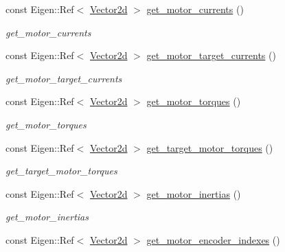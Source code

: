 \begin{DoxyCompactItemize}
const Eigen\+::\+Ref$<$ \hyperlink{common__header_8hpp_acb6916bc8c9fe9d98c484fd4cc201447}{Vector2d} $>$ \hyperlink{classblmc__robots_1_1Stuggihop_a6da6fdecb11573e52a0c059d84e7f4c5}{get\+\_\+motor\+\_\+currents} ()
\begin{DoxyCompactList}\small\item\em get\+\_\+motor\+\_\+currents \end{DoxyCompactList}\item 
const Eigen\+::\+Ref$<$ \hyperlink{common__header_8hpp_acb6916bc8c9fe9d98c484fd4cc201447}{Vector2d} $>$ \hyperlink{classblmc__robots_1_1Stuggihop_a8caaf3092fab4df7cb4a21c785a92caa}{get\+\_\+motor\+\_\+target\+\_\+currents} ()
\begin{DoxyCompactList}\small\item\em get\+\_\+motor\+\_\+target\+\_\+currents \end{DoxyCompactList}\item 
const Eigen\+::\+Ref$<$ \hyperlink{common__header_8hpp_acb6916bc8c9fe9d98c484fd4cc201447}{Vector2d} $>$ \hyperlink{classblmc__robots_1_1Stuggihop_aa3c24185a4ce67f235c535e4913832d2}{get\+\_\+motor\+\_\+torques} ()
\begin{DoxyCompactList}\small\item\em get\+\_\+motor\+\_\+torques \end{DoxyCompactList}\item 
const Eigen\+::\+Ref$<$ \hyperlink{common__header_8hpp_acb6916bc8c9fe9d98c484fd4cc201447}{Vector2d} $>$ \hyperlink{classblmc__robots_1_1Stuggihop_aa37d49ec5e4fb52bac480aa552fc4546}{get\+\_\+target\+\_\+motor\+\_\+torques} ()
\begin{DoxyCompactList}\small\item\em get\+\_\+target\+\_\+motor\+\_\+torques \end{DoxyCompactList}\item 
const Eigen\+::\+Ref$<$ \hyperlink{common__header_8hpp_acb6916bc8c9fe9d98c484fd4cc201447}{Vector2d} $>$ \hyperlink{classblmc__robots_1_1Stuggihop_acffc9bf97d4b58ad49703855a70b95cf}{get\+\_\+motor\+\_\+inertias} ()
\begin{DoxyCompactList}\small\item\em get\+\_\+motor\+\_\+inertias \end{DoxyCompactList}\item 
const Eigen\+::\+Ref$<$ \hyperlink{common__header_8hpp_acb6916bc8c9fe9d98c484fd4cc201447}{Vector2d} $>$ \hyperlink{classblmc__robots_1_1Stuggihop_a41fda0b6e5b070341e342291c1d0fd1d}{get\+\_\+motor\+\_\+encoder\+\_\+indexes} ()

\end{DoxyCompactItemize}
